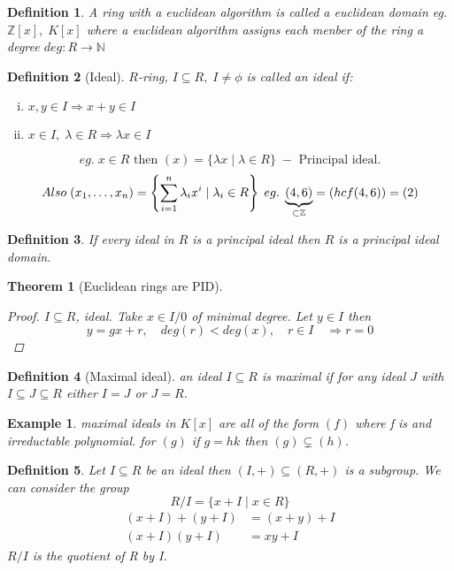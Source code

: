 \documentclass[12pt]{article}
\def\ZZ{\mathbb{Z}}
\newtheorem{theorem}{Theorem}[section]
\newtheorem{definition}{Definition}[section]
\newtheorem{example}{Example}[section]
\begin{document}
\begin{definition} A ring with a euclidean algorithm is called a euclidean domain eg. $\ZZ [x], \; K[x]$ where a euclidean algorithm assigns each menber of the ring a degree $deg:R \rightarrow \mathbb{N}$
\end{definition}

\begin{definition}[Ideal]
$R$-ring, $I\subseteq R, \; I \neq \phi$ is called an ideal if:
\begin{enumerate}[(i)]
\item $x,y \in I \Rightarrow x+y \in I$
\item $x \in I, \; \lambda \in R \Rightarrow \lambda x \in I$
\end{enumerate}
\[eg.\; x \in R \text{ then }(x) = \{\lambda x \; | \; \lambda \in R \} \;-\text{ Principal ideal.}\]
\[Also \; (x_1 , \dots , x_n ) = \left\{ \sum_{i=1}^{n}\lambda_ix^i \; | \; \lambda_i \in R\right\} \; eg. \;\underbrace{(4,6)}_{\mathclap{\subset \ZZ}} = (hcf(4,6)) = (2)\]
\end{definition}
\begin{definition} If every ideal in $R$ is a principal ideal then $R$ is a principal ideal domain.
\end{definition}

\begin{theorem}[Euclidean rings are PID]\quad\\
\begin{proof}
$I \subseteq R$, ideal. Take $x \in I/0$ of minimal degree. Let $y \in I$ then 
\[y=gx + r, \quad deg(r)<deg(x), \quad r \in I \quad \Rightarrow r=0\]
\end{proof}
\end{theorem}


\begin{definition}[Maximal ideal]
an ideal $I \subseteq R$ is maximal if for any ideal $J$ with $I \subseteq J \subseteq R$ either $I =J$ or $J=R$.
\end{definition}

\begin{example}
maximal ideals in $K[x]$ are all of the form $(f)$ where f is and irreductable polynomial. for $(g)$ if $g=hk$ then $(g) \subsetneq (h)$. 
\end{example}
\begin{definition}
Let $I \subseteq R$ be an ideal then $(I,+) \subseteq (R,+)$ is a subgroup. We can consider the group 
\[R/I = \{x+I\;|\;x \in R\}\]
\begin{align*}
(x+I) +(y+I) &= (x+y) + I\\
(x+I)(y+I) &= xy + I
\end{align*}
$R/I$ is the quotient of R by I.
\end{definition}
\end{document}
